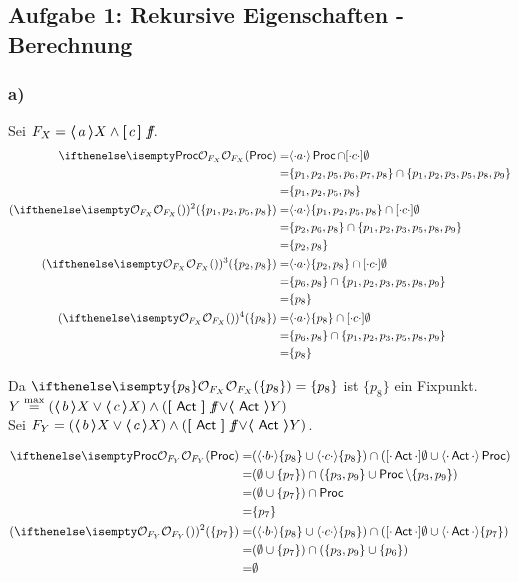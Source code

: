 \subsection*{Aufgabe 1: Rekursive Eigenschaften - Berechnung}

\subsubsection*{a)}
Sei $F_X = \boldsymbol{\langle} \, a \, \boldsymbol{\rangle} X \land \boldsymbol{[} \, c \, \boldsymbol{]}\,\mathop{\textit{f}\!\textit{f}} $.
\begin{align*}
\OSem{F_X}{\Proc} =& \possDenot{a}\Proc \cap \necessDenot{c}\emptyset \\
				  =& \{p_1,p_2,p_5,p_6,p_7,p_8\} \cap \{p_1,p_2,p_3,p_5,p_8,p_9\} \\
				  =& \{p_1,p_2,p_5,p_8\} \\
(\OSem{F_X}{})^2(\{p_1,p_2,p_5,p_8\}) =& \possDenot{a}\{p_1,p_2,p_5,p_8\} \cap \necessDenot{c}\emptyset \\
				  =& \{p_2,p_6,p_8\} \cap \{p_1,p_2,p_3,p_5,p_8,p_9\} \\
				  =& \{p_2,p_8\} \\
(\OSem{F_X}{})^3(\{p_2,p_8\}) =& \possDenot{a}\{p_2,p_8\} \cap \necessDenot{c}\emptyset \\
				  =& \{p_6,p_8\} \cap \{p_1,p_2,p_3,p_5,p_8,p_9\} \\
				  =& \{p_8\} \\
(\OSem{F_X}{})^4(\{p_8\}) =& \possDenot{a}\{p_8\} \cap \necessDenot{c}\emptyset \\
				  =& \{p_6,p_8\} \cap \{p_1,p_2,p_3,p_5,p_8,p_9\} \\
				  =& \{p_8\} \\
\end{align*}

Da $\OSem{F_X}{\{p_8\} } = \{p_8\}$ ist $\{p_8\}$ ein Fixpunkt. \\

$Y \stackrel{\operatorname{max}}{=} (\boldsymbol{\langle} \, b \, \boldsymbol{\rangle}X \lor \boldsymbol{\langle} \, c \, \boldsymbol{\rangle}X) \land (\boldsymbol{[} \, \operatorname{\sf Act} \, \boldsymbol{]}\,\mathop{\textit{f}\!\textit{f}} \lor \boldsymbol{\langle} \, \operatorname{\sf Act} \, \boldsymbol{\rangle}Y)$\\
Sei $F_Y = (\boldsymbol{\langle} \, b \, \boldsymbol{\rangle}X \lor \boldsymbol{\langle} \, c \, \boldsymbol{\rangle}X) \land (\boldsymbol{[} \, \operatorname{\sf Act} \, \boldsymbol{]}\,\mathop{\textit{f}\!\textit{f}} \lor \boldsymbol{\langle} \, \operatorname{\sf Act} \, \boldsymbol{\rangle}Y)$.

\begin{align*}
\OSem{F_Y}{\Proc} =& ( \possDenot{b}\{p_8\} \cup \possDenot{c}\{p_8\}) \cap (\necessDenot{\Act}\emptyset \cup \possDenot{\Act} \Proc) \\
				  =& (\emptyset \cup \{p_7\}) \cap (\{p_3,p_9\} \cup \Proc\setminus\{p_3,p_9\}) \\
				  =& (\emptyset \cup \{p_7\}) \cap \Proc \\
				  =& \{p_7\} \\
(\OSem{F_Y}{})^2(\{p_7\}) =& (\possDenot{b}\{p_8\} \cup \possDenot{c}\{p_8\}) \cap (\necessDenot{\Act}\emptyset \cup \possDenot{\Act}\{p_7\}) \\
				  =& (\emptyset \cup \{p_7\}) \cap (\{p_3,p_9\} \cup \{p_6\})\\
				  =& \emptyset
\end{align*}

